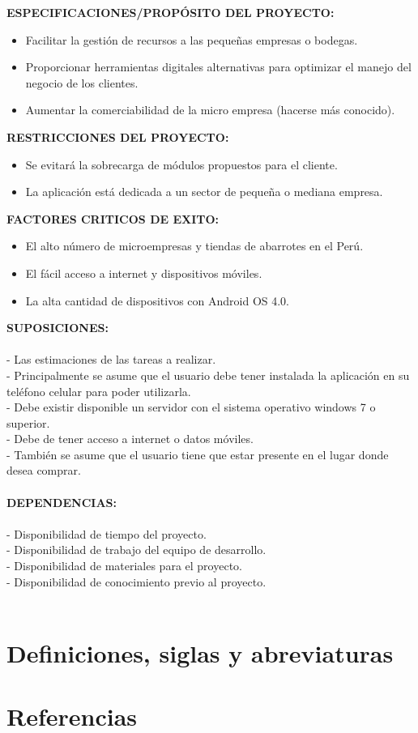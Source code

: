 \textbf{ESPECIFICACIONES/PROPÓSITO DEL PROYECTO:}
\begin{itemize}
\item Facilitar la gestión de recursos a las pequeñas empresas o bodegas.
\item Proporcionar herramientas digitales alternativas para optimizar el manejo del negocio de los clientes.
\item Aumentar la comerciabilidad de la micro empresa (hacerse más conocido).
\end{itemize}
\textbf{RESTRICCIONES DEL PROYECTO:}
\begin{itemize}
\item Se evitará la sobrecarga de módulos propuestos para el cliente.
\item La aplicación está dedicada a un sector de pequeña o mediana empresa.
\end{itemize}
\textbf{FACTORES CRITICOS DE EXITO:}
\begin{itemize}
\item El alto número de microempresas y tiendas de abarrotes en el Perú.
\item El fácil acceso a internet y dispositivos móviles.
\item La alta cantidad de dispositivos con Android OS 4.0.
\end{itemize}
\textbf{SUPOSICIONES:}\\\\
- Las estimaciones de las tareas a realizar.\\
- Principalmente se asume que el usuario debe tener instalada la aplicación en su teléfono celular para poder utilizarla.\\
- Debe existir disponible un servidor con el sistema operativo windows 7 o superior.\\
- Debe de tener acceso a internet o datos móviles.\\
- También se asume que el usuario tiene que estar presente en el lugar donde desea comprar.
\\\\
\textbf{DEPENDENCIAS:}\\\\
- Disponibilidad de tiempo del proyecto.\\
- Disponibilidad de trabajo del equipo de desarrollo.\\
- Disponibilidad de materiales para el proyecto.\\
- Disponibilidad de conocimiento previo al proyecto.\\\\

\section{Definiciones, siglas y abreviaturas}

\section{Referencias}